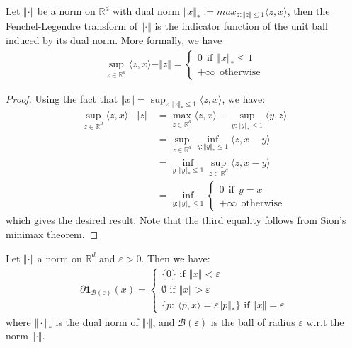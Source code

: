 \begin{lemma}
\label{lemma-fenchel-norm}
Let $\Vert\cdot\Vert$ be a norm on $\mathbb{R}^d$ with dual norm $\Vert x\Vert_{*}:=max_{z:\Vert z\Vert\leq 1} \langle z, x\rangle$, then the Fenchel-Legendre transform of $\Vert\cdot\Vert$ is the indicator function of the unit ball induced by its dual norm. More formally, we have
\begin{align*}
    \sup_{z\in\mathbb{R}^d}\langle z, x\rangle - \Vert z\Vert =  \begin{cases} 
          0 ~~\text{if}~~ \Vert x\Vert_* \leq 1\\
          +\infty ~~\text{otherwise}
       \end{cases}
\end{align*}
\end{lemma}
\begin{proof}
Using the fact that $\Vert x\Vert=\sup_{z:\Vert z\Vert_{*}\leq 1} \langle z,x\rangle$, we have:
\begin{align*}
   \sup_{z\in\mathbb{R}^d}\langle z, x\rangle - \Vert z\Vert & = \max_{z\in\mathbb{R}^d}\langle z, x\rangle  - \sup_{y:\Vert y\Vert_{*}\leq 1} \langle y,z\rangle\\
   &= \sup_{z\in\mathbb{R}^d}\inf_{y:\Vert y\Vert_{*}\leq 1} \langle z, x-y\rangle \\
   &=\inf_{y:\Vert y\Vert_{*}\leq 1}\sup_{z\in\mathbb{R}^d}\langle z, x-y\rangle\\
   &=\inf_{y:\Vert y\Vert_{*}\leq 1} \begin{cases} 
          0 ~~\text{if}~~y=x\\
          +\infty ~~\text{otherwise}
       \end{cases}
\end{align*}
which gives the desired result. Note that the third equality follows from Sion's minimax theorem. 
\end{proof}


\begin{lemma}
\label{lemma-subdiff-indicator}
Let $\Vert \cdot\Vert$ a norm on $\mathbb{R}^d$ and $\varepsilon>0$. Then we have:
\begin{align*}
\partial\bm{1}_{\mathcal{B}(\varepsilon)}(x)=\begin{cases} 
          \{0\}\text{ if } \Vert x\Vert< \varepsilon\\
          \emptyset \text{ if } \Vert x\Vert> \varepsilon\\
          \{p:~\langle p, x\rangle =\varepsilon\Vert p\Vert_*\} \text{ if } \Vert x\Vert=\varepsilon
       \end{cases}
\end{align*}
where $\Vert \cdot \Vert_*$ is the dual norm of $\Vert \cdot \Vert$, and $\mathcal{B}(\varepsilon)$ is the ball of radius $\varepsilon$ w.r.t the norm $\Vert \cdot \Vert$.
\end{lemma}

